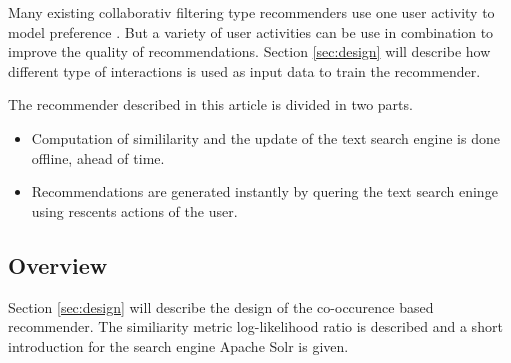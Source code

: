 Many existing collaborativ filtering type recommenders use one user activity to model preference \cite{ferrel}. But a variety of user activities can be use in combination to improve the quality of recommendations. Section \ref{sec:design} will describe how different type of interactions is used as input data to train the recommender.


The recommender described in this article is divided in two parts.
\begin{itemize}
\item Computation of simililarity and the update of the text search engine is done offline, ahead of time.
\item Recommendations are generated instantly by quering the text search eninge using rescents actions of the user.


\end{itemize}

\subsection{Overview}

Section \ref{sec:design} will describe the design of the co-occurence based recommender. The similiarity metric log-likelihood ratio is described and a short introduction for the search engine Apache Solr is given.

